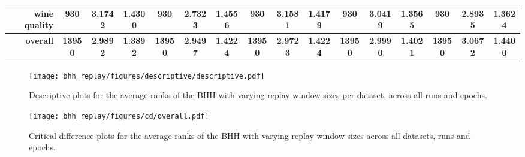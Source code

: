 \begin{table}[htbp]
{\begin{tabular}{rccccccccccccccc}
			wine quality                        & 930                                 & 3.1742                                                                    & 1.4300          & 930                            & \cellcolor[rgb]{ .776,  .937,  .808}\textcolor[rgb]{ 0,  .38,  0}{2.7323}          & 1.4556          & 930                             & 3.1581                                                                    & 1.4179          & 930                             & 3.0419                                                                    & 1.3565          & 930                             & 2.8935          & 1.3624          \\
			\midrule
			\textbf{overall}                    & \textbf{13950}                      & \textbf{2.9892}                                                           & \textbf{1.3892} & \textbf{13950}                 & \cellcolor[rgb]{ .776,  .937,  .808}\textcolor[rgb]{ 0,  .38,  0}{\textbf{2.9497}} & \textbf{1.4224} & \textbf{13950}                  & \textbf{2.9723}                                                           & \textbf{1.4224} & \textbf{13950}                  & \textbf{2.9990}                                                           & \textbf{1.4021} & \textbf{13950}                  & \textbf{3.0672} & \textbf{1.4400} \\
		\end{tabular}%
	}
\end{table}%

\begin{figure}[htbp]
	\centering
	\texttt{[image: bhh\_replay/figures/descriptive/descriptive.pdf]}
	\caption{Descriptive plots for the average ranks of the \acs{BHH} with varying replay window sizes per dataset, across all runs and epochs.}
	\label{fig:results:replay:descriptive:descriptive}
\end{figure}

\begin{figure}[htbp]
	\centering
	\texttt{[image: bhh\_replay/figures/cd/overall.pdf]}
	\caption{Critical difference plots for the average ranks of the \acs{BHH} with varying replay window sizes across all datasets, runs and epochs.}
	\label{fig:results:replay:descriptive:cd}
\end{figure}

